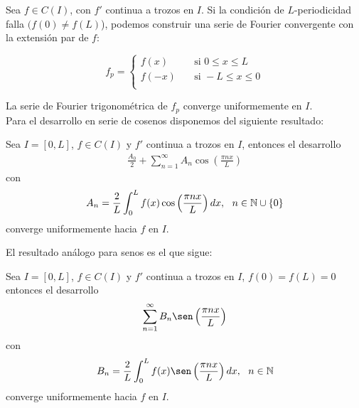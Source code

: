\documentclass[12pt]{book}
\begin{document}
    Sea $f \in C(I)$, con $f'$ continua a trozos en $I$. Si la condición de $L$-periodicidad falla $(f(0) \neq f(L)$), podemos construir una serie de Fourier convergente con la extensión par de $f$:

    $$f_p = \begin{cases}
        f(x) \quad& \text{si } 0 \leq x \leq L \\
        f(-x) \quad& \text{si } -L \leq x \leq 0 \\
    \end{cases}$$

    La serie de Fourier trigonométrica de $f_p$ converge uniformemente en $I$. \\

    Para el desarrollo en serie de cosenos disponemos del siguiente resultado:

    \begin{teo}
        Sea $I = [0,L]$, $f \in C(I)$ y $f'$ continua a trozos en $I$, entonces el desarrollo 
        \begin{gather}
            \frac{A_0}{2} + \sum_{n=1}^{\infty} A_n \cos \left(\frac{\pi n x}{L}\right)
        \end{gather}
        con
        \begin{gather}
            A_n = \frac{2}{L} \int_0^L f(x) \cos \left(\frac{\pi n x}{L}\right) dx,\ \ n\in \mathbb{N}\cup \{0\}
        \end{gather}
        converge uniformemente hacia $f$ en $I$.
    \end{teo}

    El resultado análogo para senos es el que sigue:

    \begin{teo}
        Sea $I = [0,L]$, $f \in C(I)$ y $f'$ continua a trozos en $I$, 
        $f(0) = f(L) = 0$ entonces el desarrollo 
        \begin{gather}
            \sum_{n=1}^{\infty} B_n \sen \left(\frac{\pi n x}{L}\right)
        \end{gather}
        con
        \begin{gather}
            B_n = \frac{2}{L} \int_0^L f(x) \sen \left(\frac{\pi n x}{L}\right) dx,\ \ n\in \bb{N}
        \end{gather}
        converge uniformemente hacia $f$ en $I$.
    \end{teo}
\end{document}
